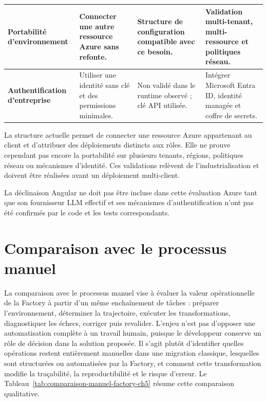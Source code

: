 \begin{table}[H]
\begin{tabularx}{\textwidth}{|>{\bfseries\RaggedRight\arraybackslash}p{3cm}|>{\RaggedRight\arraybackslash}p{4.5cm}|>{\RaggedRight\arraybackslash}p{4.5cm}|>{\RaggedRight\arraybackslash}X|}
        \hline
        Portabilité d'environnement & Connecter une autre ressource Azure sans refonte. & Structure de configuration compatible avec ce besoin. & Validation multi-tenant, multi-ressource et politiques réseau. \\
        \hline
        Authentification d'entreprise & Utiliser une identité sans clé et des permissions minimales. & Non validé dans le runtime observé ; clé API utilisée. & Intégrer Microsoft Entra ID, identité managée et coffre de secrets. \\
        \hline
    \end{tabularx}
\end{table}

La structure actuelle permet de connecter une ressource Azure appartenant au client et d'attribuer des déploiements distincts aux rôles. Elle ne prouve cependant pas encore la portabilité sur plusieurs tenants, régions, politiques réseau ou mécanismes d'identité. Ces validations relèvent de l'industrialisation et doivent être réalisées avant un déploiement multi-client.

La déclinaison Angular ne doit pas être incluse dans cette évaluation Azure tant que son fournisseur LLM effectif et ses mécanismes d'authentification n'ont pas été confirmés par le code et les tests correspondants.

\section{Comparaison avec le processus manuel}

La comparaison avec le processus manuel vise à évaluer la valeur opérationnelle de la Factory à partir d'un même enchaînement de tâches : préparer l'environnement, déterminer la trajectoire, exécuter les transformations, diagnostiquer les échecs, corriger puis revalider. L'enjeu n'est pas d'opposer une automatisation complète à un travail humain, puisque le développeur conserve un rôle de décision dans la solution proposée. Il s'agit plutôt d'identifier quelles opérations restent entièrement manuelles dans une migration classique, lesquelles sont structurées ou automatisées par la Factory, et comment cette transformation modifie la traçabilité, la reproductibilité et le risque d'erreur. Le Tableau~\ref{tab:comparaison-manuel-factory-ch5} résume cette comparaison qualitative.

